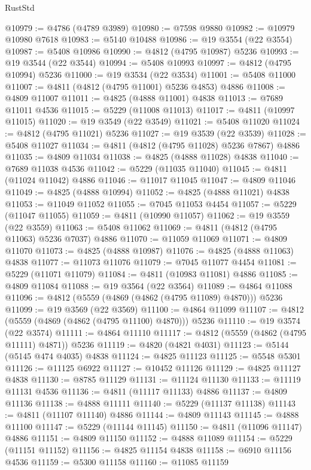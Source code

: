 \begin{lexlean}{RustStd}
\begin{coremodule}
{\begin{coremodule}
{{{{{{{{{{{{{{{{{{{{{{{{{{{{{{{{{{{{{{{{{{{{{{{{{{{{{{{{{{{{{{{{{{{{{{{{{{{{{{{{@10979 := @4786 (@4789 @3989)
@10980 := @7598 @9880
@10982 := @10979 @10980 @7618
@10983 := @5140 @10488
@10986 := @19 @3554 (@22 @3554)
@10987 := @5408 @10986
@10990 := @4812 (@4795 @10987) @5236
@10993 := @19 @3544 (@22 @3544)
@10994 := @5408 @10993
@10997 := @4812 (@4795 @10994) @5236
@11000 := @19 @3534 (@22 @3534)
@11001 := @5408 @11000
@11007 := @4811 (@4812 (@4795 @11001) @5236 @4853) @4886
@11008 := @4809 @11007
@11011 := @4825 (@4888 @11001) @4838
@11013 := @7689 @11011 @4536
@11015 := @5229 (@11008 @11013)
@11017 := @4811 (@10997 @11015)
@11020 := @19 @3549 (@22 @3549)
@11021 := @5408 @11020
@11024 := @4812 (@4795 @11021) @5236
@11027 := @19 @3539 (@22 @3539)
@11028 := @5408 @11027
@11034 := @4811 (@4812 (@4795 @11028) @5236 @7867) @4886
@11035 := @4809 @11034
@11038 := @4825 (@4888 @11028) @4838
@11040 := @7689 @11038 @4536
@11042 := @5229 (@11035 @11040)
@11045 := @4811 (@11024 @11042) @4886
@11046 := @11017 @11045
@11047 := @4809 @11046
@11049 := @4825 (@4888 @10994)
@11052 := @4825 (@4888 @11021) @4838
@11053 := @11049 @11052
@11055 := @7045 @11053 @4454
@11057 := @5229 (@11047 @11055)
@11059 := @4811 (@10990 @11057)
@11062 := @19 @3559 (@22 @3559)
@11063 := @5408 @11062
@11069 := @4811 (@4812 (@4795 @11063) @5236 @7037) @4886
@11070 := @11059 @11069
@11071 := @4809 @11070
@11073 := @4825 (@4888 @10987)
@11076 := @4825 (@4888 @11063) @4838
@11077 := @11073 @11076
@11079 := @7045 @11077 @4454
@11081 := @5229 (@11071 @11079)
@11084 := @4811 (@10983 @11081) @4886
@11085 := @4809 @11084
@11088 := @19 @3564 (@22 @3564)
@11089 := @4864 @11088
@11096 := @4812 (@5559 (@4869 (@4862 (@4795 @11089) @4870))) @5236
@11099 := @19 @3569 (@22 @3569)
@11100 := @4864 @11099
@11107 := @4812 (@5559 (@4869 (@4862 (@4795 @11100) @4870))) @5236
@11110 := @19 @3574 (@22 @3574)
@11111 := @4864 @11110
@11117 := @4812 (@5559 (@4862 (@4795 @11111) @4871)) @5236
@11119 := @4820 (@4821 @4031)
@11123 := @5144 (@5145 @474 @4035) @4838
@11124 := @4825 @11123
@11125 := @5548 @5301
@11126 := @11125 @6922
@11127 := @10452 @11126
@11129 := @4825 @11127 @4838
@11130 := @8785 @11129
@11131 := @11124 @11130
@11133 := @11119 @11131 @4536
@11136 := @4811 (@11117 @11133) @4886
@11137 := @4809 @11136
@11138 := @4888 @11111
@11140 := @5229 (@11137 @11138)
@11143 := @4811 (@11107 @11140) @4886
@11144 := @4809 @11143
@11145 := @4888 @11100
@11147 := @5229 (@11144 @11145)
@11150 := @4811 (@11096 @11147) @4886
@11151 := @4809 @11150
@11152 := @4888 @11089
@11154 := @5229 (@11151 @11152)
@11156 := @4825 @11154 @4838
@11158 := @6910 @11156 @4536
@11159 := @5300 @11158
@11160 := @11085 @11159
}}}}}}}}}}}}}}}}}}}}}}}}}}}}}}}}}}}}}}}}}}}}}}}}}}}}}}}}}}}}}}}}}}}}}}}}}}}}}}}}
\end{coremodule}}
\end{coremodule}
\end{lexlean}
